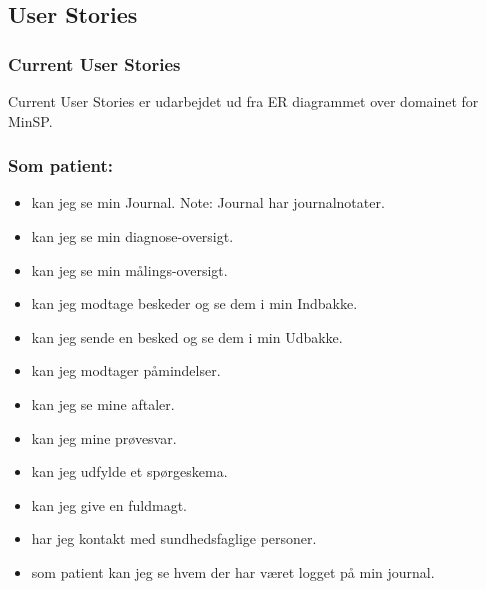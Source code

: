 %
%
%
%
%
%
\subsection{User Stories}
\subsubsection{Current User Stories} %
Current User Stories er udarbejdet ud fra ER diagrammet over domainet for MinSP. 
\subsubsection*{Som patient:}
\begin{itemize}
\item kan jeg se min Journal. Note: Journal har journalnotater. 
\item kan jeg se min diagnose-oversigt.
\item kan jeg se min målings-oversigt.
\item kan jeg modtage beskeder og se dem i min Indbakke.
\item kan jeg sende en besked og se dem i min Udbakke.
\item kan jeg modtager påmindelser.
\item kan jeg se mine aftaler. 
\item kan jeg mine prøvesvar.
\item kan jeg udfylde et spørgeskema.
\item kan jeg give en fuldmagt. 
\item har jeg kontakt med sundhedsfaglige personer. 
\item som patient kan jeg se hvem der har været logget på min journal.
\end{itemize}
